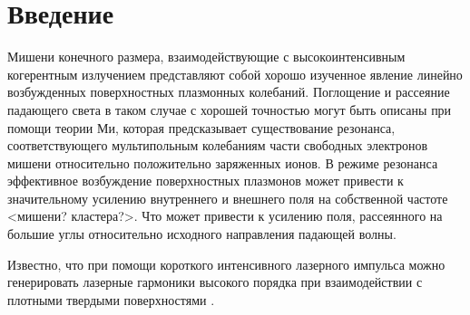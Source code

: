 \section*{Введение}

Мишени конечного размера, взаимодействующие с высокоинтенсивным когерентным излучением представляют собой хорошо изученное явление линейно возбужденных 
поверхностных плазмонных колебаний. Поглощение и рассеяние падающего света в таком случае с хорошей точностью могут быть описаны при помощи теории Ми, которая предсказывает существование резонанса, соответствующего мультипольным колебаниям части свободных электронов мишени относительно положительно заряженных ионов. В режиме резонанса эффективное возбуждение поверхностных плазмонов может привести к значительному усилению внутреннего и внешнего 
поля на собственной частоте <мишени? кластера?>. Что может привести к усилению поля, рассеянного на большие углы относительно исходного направления падающей волны.

Известно, что при помощи короткого интенсивного лазерного импульса можно генерировать лазерные гармоники высокого порядка при взаимодействии с плотными твердыми поверхностями \cite{teubner_gibbon_hoh}. 

